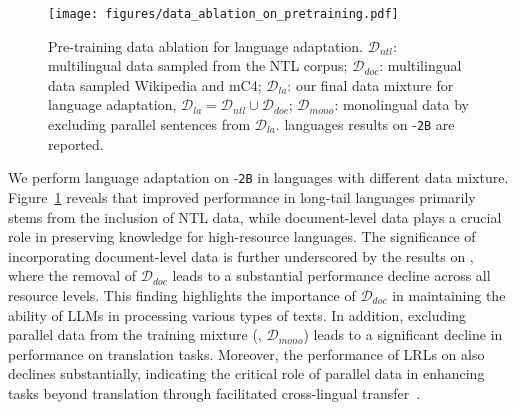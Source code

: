 \begin{figure}[t]
    \setlength{\abovecaptionskip}{-0.0001cm}
    \setlength{\belowcaptionskip}{-0.35cm}
    \centering
    \texttt{[image: figures/data\_ablation\_on\_pretraining.pdf]}
    \vspace{-8mm}
    \caption{Pre-training data ablation for language adaptation. $\mathcal{D}_{ntl}$: multilingual data sampled from the NTL corpus; $\mathcal{D}_{doc}$: multilingual data sampled Wikipedia and mC4; $\mathcal{D}_{la}$: our final data mixture for language adaptation, \ie $\mathcal{D}_{la}=\mathcal{D}_{ntl}\cup\mathcal{D}_{doc}$; $\mathcal{D}_{mono}$: monolingual data by excluding parallel sentences from $\mathcal{D}_{la}$. \sea languages results on \gemmatwo-\texttt{2B} are reported.}
    \vspace{-4mm}
    \label{fig:data_ablation_on_pretraining}
\end{figure}
We perform language adaptation on \gemmatwo-\texttt{2B} in \sea languages with different data mixture. Figure~\ref{fig:data_ablation_on_pretraining} reveals that improved performance in long-tail languages primarily stems from the inclusion of NTL data, while document-level data  plays a crucial role in preserving knowledge for high-resource languages. The significance of incorporating document-level data is further underscored by the results on \belebele, where the removal of $\mathcal{D}_{doc}$ leads to a substantial performance decline across all resource levels. This finding highlights the importance of $\mathcal{D}_{doc}$ in maintaining the ability of LLMs in processing various types of texts. In addition, excluding parallel data from the training mixture (\ie, $\mathcal{D}_{mono}$) leads to a significant decline in performance on translation tasks. Moreover, the performance of LRLs on \belebele also declines substantially, indicating the critical role of parallel data in enhancing tasks beyond translation through facilitated cross-lingual transfer~\citep{anil2023palm}.


